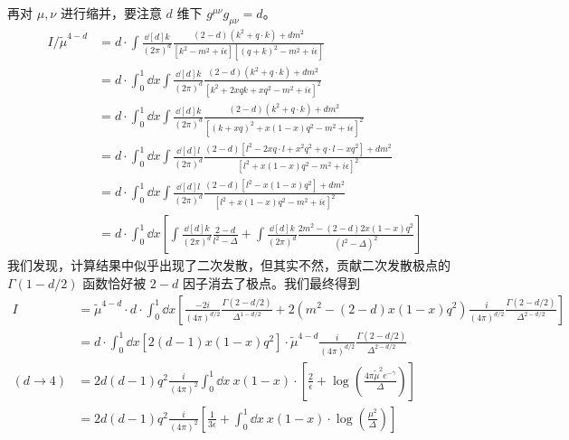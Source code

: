 再对 $\mu,\nu$ 进行缩并，要注意 $d$ 维下 $g^{\mu\nu}g_{\mu\nu}=d$。
\begin{equation}
\begin{aligned}
	I / \tilde{\mu}^{4-d} &= d \cdot\int \frac{\dd[d]{k}}{(2\pi)^d} \frac{(2-d)(k^2+q\cdot k) + d m^2}{[k^2-m^2+i\epsilon][(q+k)^2-m^2+i\epsilon]}\\
    &=d\cdot\int_0^1\dd x \int\frac{\dd[d]{k}}{(2\pi)^d} \frac{(2-d)(k^2+q\cdot k) + d m^2}{[k^2+2xqk+xq^2-m^2+i\epsilon]^2}\\
    &=d\cdot\int_0^1\dd x\int  \frac{\dd[d]{k}}{(2\pi)^d} \frac{(2-d)(k^2+q\cdot k)+d m^2}{[ (k+xq)^2 +x(1- x)q^2-m^2+i\epsilon ]^2}\\
    &=d\cdot\int_0^1\dd x\int  \frac{\dd[d]{l}}{(2\pi)^d} \frac{(2-d)\left[l^2 -2xq\cdot l +x^2q^2 +q\cdot l-x q^2\right]+d m^2}{[ l^2 +x(1- x)q^2-m^2+i\epsilon ]^2}\\
    &=d\cdot\int_0^1\dd x\int  \frac{\dd[d]{l}}{(2\pi)^d} \frac{(2-d)\left[l^2 -x(1-x)q^2\right]+d m^2}{[ l^2 +x(1- x)q^2-m^2+i\epsilon ]^2}\\
    &=d\cdot \int_0^1\dd x\left[\int\frac{\dd[d]{k}}{(2\pi)^d}\frac{2-d}{l^2-\Delta}+\int \frac{\dd[d]{k}}{(2\pi)^d}\frac{2m^2-(2-d)2x(1-x)q^2}{(l^2-\Delta)^2}\right]
\end{aligned}
\end{equation}
我们发现，计算结果中似乎出现了二次发散，但其实不然，贡献二次发散极点的 $\Gamma(1-d/2)$ 函数恰好被 $2-d$ 因子消去了极点。我们最终得到
\begin{equation}
\begin{aligned}
I&=\tilde{\mu}^{4-d}\cdot d\cdot\int_0^1\dd x \left[\frac{-2i}{(4\pi)^{d/2}}\frac{\Gamma(2-d/2)}{\Delta^{1-d/2}}+2(m^2-(2-d)x(1-x)q^2)\frac{i}{(4\pi)^{d/2}}\frac{\Gamma(2-d/2)}{\Delta^{2-d/2}}\right]\\
&= d \cdot \int_0^1\dd x [2(d-1)x(1-x)q^2] \cdot \tilde{\mu}^{4-d}\frac{i}{(4\pi)^{d/2}}\frac{\Gamma(2-d/2)}{\Delta^{2-d/2}}\\
(d\rightarrow 4)&=2d(d-1)q^2 \frac{i}{(4\pi)^2}\int_0^1 \dd x\ x(1-x)\cdot\left[ \frac{2}{\epsilon}+\log\left(\frac{4\pi \tilde{\mu}^2 e^{-\gamma}}{\Delta}\right) \right]\\
&=2d(d-1)q^2 \frac{i}{(4\pi)^2}\left[\frac{1}{3\epsilon}+\int_0^1 \dd x\ x(1-x)\cdot\log\left(\frac{\mu^2}{\Delta}\right)\right]
\end{aligned}
\end{equation}
